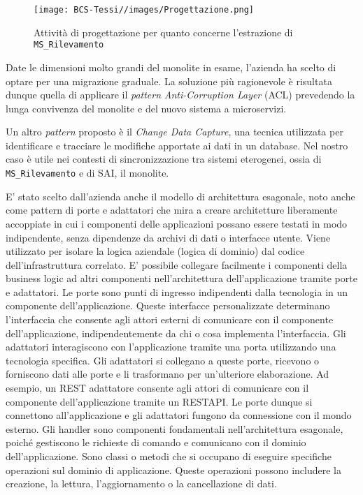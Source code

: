         \begin{figure}
            \centering
            \texttt{[image: BCS-Tessi//images/Progettazione.png]}
            \caption[Progettazione per l'estrazione del microservizio]{Attività di progettazione per quanto concerne l'estrazione di \texttt{MS\_Rilevamento}}
            \label{fig:progettazione}
        \end{figure}

        \vspace{0.2 em}
        \noindent Date le dimensioni molto grandi del monolite in esame, l'azienda ha scelto di optare per una migrazione graduale. La soluzione più ragionevole è risultata dunque quella di applicare il \textit{pattern} \textit{Anti-Corruption Layer} (ACL) prevedendo la lunga convivenza del monolite e del nuovo sistema a microservizi. 

        \vspace{0.2 em}
        \noindent Un altro \textit{pattern} proposto è il \textit{Change Data Capture}, una tecnica utilizzata per identificare e tracciare le modifiche apportate ai dati in un database. Nel nostro caso è utile nei contesti di sincronizzazione tra sistemi eterogenei, ossia di \texttt{MS\_Rilevamento} e di SAI, il monolite. 
        
        E' stato scelto dall'azienda anche il modello di architettura esagonale, noto anche come pattern di porte e adattatori che mira a creare architetture liberamente accoppiate in cui i componenti delle applicazioni possano essere testati in modo indipendente, senza dipendenze da archivi di dati o interfacce utente. Viene utilizzato per isolare la logica aziendale (logica di dominio) dal codice dell'infrastruttura correlato. E' possibile collegare facilmente i componenti della business logic ad altri componenti nell'architettura dell'applicazione tramite porte e adattatori. Le porte sono punti di ingresso indipendenti dalla tecnologia in un componente dell'applicazione. Queste interfacce personalizzate determinano l'interfaccia che consente agli attori esterni di comunicare con il componente dell'applicazione, indipendentemente da chi o cosa implementa l'interfaccia. Gli adattatori interagiscono con l'applicazione tramite una porta utilizzando una tecnologia specifica. Gli adattatori si collegano a queste porte, ricevono o forniscono dati alle porte e li trasformano per un'ulteriore elaborazione. Ad esempio, un REST adattatore consente agli attori di comunicare con il componente dell'applicazione tramite un RESTAPI. Le porte dunque si connettono all'applicazione e gli adattatori fungono da connessione con il mondo esterno. Gli handler sono componenti fondamentali nell'architettura esagonale, poiché gestiscono le richieste di comando e comunicano con il dominio dell'applicazione. Sono classi o metodi che si occupano di eseguire specifiche operazioni sul dominio di applicazione. Queste operazioni possono includere la creazione, la lettura, l'aggiornamento o la cancellazione di dati.

